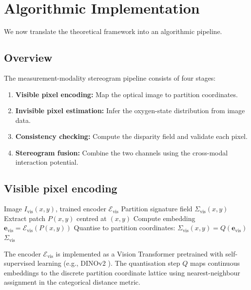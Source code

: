 \documentclass[11pt,twocolumn,a4paper]{article}
\newcommand{\Sigvis}{\Sigma_{\mathrm{vis}}}
\begin{document}
\section{Algorithmic Implementation}\label{sec:algorithm}

We now translate the theoretical framework into an algorithmic pipeline.

\subsection{Overview}

The measurement-modality stereogram pipeline consists of four stages:
\begin{enumerate}
\item \textbf{Visible pixel encoding:} Map the optical image to partition coordinates.
\item \textbf{Invisible pixel estimation:} Infer the oxygen-state distribution from image data.
\item \textbf{Consistency checking:} Compute the disparity field and validate each pixel.
\item \textbf{Stereogram fusion:} Combine the two channels using the cross-modal interaction potential.
\end{enumerate}

\subsection{Visible pixel encoding}

\begin{algorithm}[H]
\caption{Visible Pixel Encoding}\label{alg:visible}
\begin{algorithmic}[1]
\REQUIRE Image $I_{\mathrm{vis}}(x,y)$, trained encoder $\mathcal{E}_{\mathrm{vis}}$
\ENSURE Partition signature field $\Sigvis(x,y)$
    \STATE Extract patch $P(x,y)$ centred at $(x,y)$
    \STATE Compute embedding $\mathbf{e}_{\mathrm{vis}} = \mathcal{E}_{\mathrm{vis}}(P(x,y))$
    \STATE Quantise to partition coordinates: $\Sigvis(x,y) = Q(\mathbf{e}_{\mathrm{vis}})$
\ENDFOR
\RETURN $\Sigvis$
\end{algorithmic}
\end{algorithm}

The encoder $\mathcal{E}_{\mathrm{vis}}$ is implemented as a Vision Transformer \citep{Dosovitskiy2021} pretrained with self-supervised learning (e.g., DINOv2 \citep{Oquab2024}).
The quantisation step $Q$ maps continuous embeddings to the discrete partition coordinate lattice using nearest-neighbour assignment in the categorical distance metric.
\end{document}
